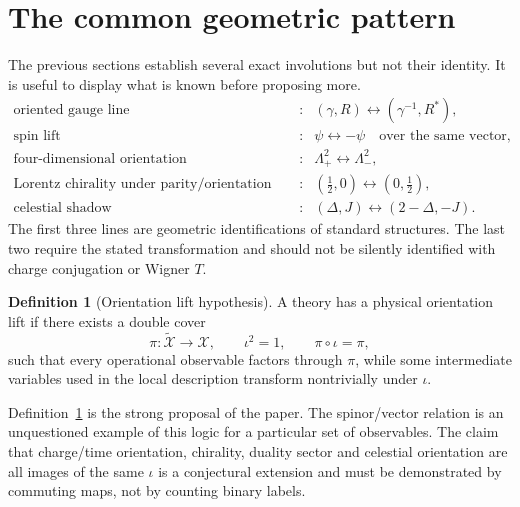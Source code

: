 \documentclass[11pt]{article}
\theoremstyle{definition}\newtheorem{definition}[theorem]{Definition}
\theoremstyle{remark}\newtheorem{remark}[theorem]{Remark}\newtheorem{conjecture}[theorem]{Conjecture}
\begin{document}
\section{The common geometric pattern}
The previous sections establish several exact involutions but not their identity. It is useful to display what is known before proposing more.
\begin{equation}
\begin{array}{ccl}
\text{oriented gauge line} &:& (\gamma,R)\leftrightarrow(\gamma^{-1},R^*),\\[2mm]
\text{spin lift} &:& \psi\leftrightarrow-\psi\quad\text{over the same vector},\\[2mm]
\text{four-dimensional orientation} &:& \Lambda^2_+\leftrightarrow\Lambda^2_-,\\[2mm]
\text{Lorentz chirality under parity/orientation reversal} &:& (\tfrac12,0)\leftrightarrow(0,\tfrac12),\\[2mm]
\text{celestial shadow} &:& (\Delta,J)\leftrightarrow(2-\Delta,-J).
\end{array}
\end{equation}
The first three lines are geometric identifications of standard structures. The last two require the stated transformation and should not be silently identified with charge conjugation or Wigner $T$.

\begin{definition}[Orientation lift hypothesis]\label{def:lift}
A theory has a physical orientation lift if there exists a double cover
\begin{equation}
 \pi:\widetilde{\mathcal X}\to\mathcal X,
 \qquad \iota^2=1,\qquad \pi\circ\iota=\pi,
\end{equation}
such that every operational observable factors through $\pi$, while some intermediate variables used in the local description transform nontrivially under $\iota$.
\end{definition}

Definition~\ref{def:lift} is the strong proposal of the paper. The spinor/vector relation is an unquestioned example of this logic for a particular set of observables. The claim that charge/time orientation, chirality, duality sector and celestial orientation are all images of the same $\iota$ is a conjectural extension and must be demonstrated by commuting maps, not by counting binary labels.
\end{document}
